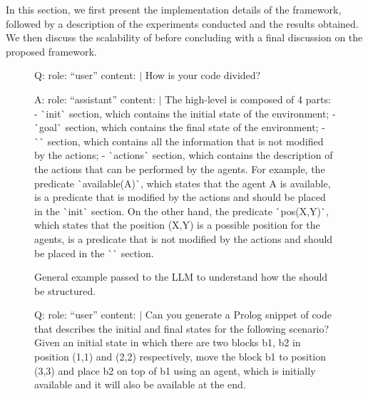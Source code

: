In this section, we first present the implementation details of the
framework, followed by a description of the experiments conducted and
the results obtained. We then discuss the scalability
of \frameworkname before concluding with a final discussion on the
proposed framework.

\begin{figure*}[htp]
    \centering
    \begin{subfigure}{0.99\linewidth}
        \centering
        \begin{textbox}{}
\footnotesize
Q:
    role: ``user''
    content: $\vert$
      How is your code divided?

A:
    role: ``assistant''
    content: $\vert$
      The high-level \kbase is composed of 4 parts:
      - \`{}init\`{} section, which contains the initial state of the environment;
      - \`{}goal\`{} section, which contains the final state of the environment;
      - \`{}\kb\`{} section, which contains all the information that is not modified by the actions;
      - \`{}actions\`{} section, which contains the description of the actions that can be performed 
         by the agents.
      For example, the predicate \`{}available(A)\`{}, which states that the agent A is available, is 
      a predicate that is modified by the actions and should be placed in the \`{}init\`{} section.
      On the other hand, the predicate \`{}pos(X,Y)\`{}, which states that the position (X,Y) is a 
      possible position for the agents, is a predicate that is not modified by the actions and 
      should be placed in the \`{}\kb\`{} section.
        \end{textbox}
        \caption{General example passed to the LLM to understand how the \kb should be structured.}
        \label{fig:genExample}
    \end{subfigure}
    \begin{subfigure}{0.99\linewidth}
        \centering
        \begin{textbox}{}
\footnotesize
Q:
    role: ``user''
    content: $\vert$ 
      Can you generate a Prolog snippet of code that describes the initial and final states for 
      the following scenario? 
      Given an initial state in which there are two blocks b1, b2 in position (1,1) and (2,2) 
      respectively, move the block b1 to position (3,3) and place b2 on top of b1 using an 
      agent, which is initially available and it will also be available at the end.


\end{textbox}
\end{subfigure}
\end{figure*}
